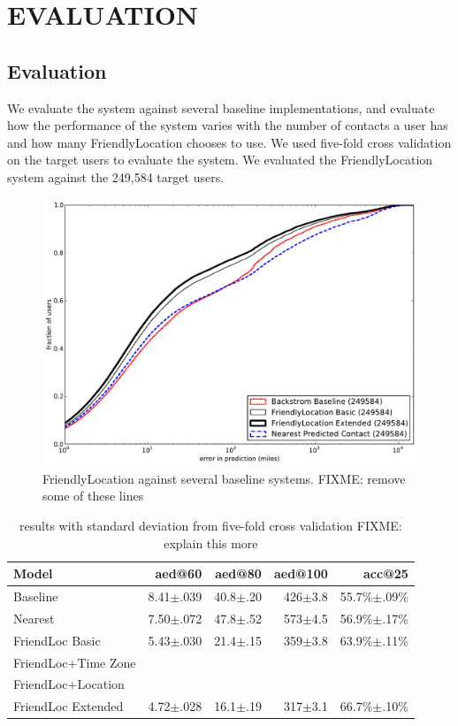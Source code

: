 \ifdefined\THESIS
    \chapter{\uppercase{Evaluation}}
\else
    \section{Evaluation}
\fi

We evaluate the system against several baseline implementations, and evaluate
how the performance of the system varies with the number of contacts a user has
and how many FriendlyLocation chooses to use.
We used five-fold cross validation on the target users to evaluate the system.
We evaluated the FriendlyLocation system against the 249,584 target users.

\begin{figure}[tb]
\centering
\includegraphics[width=\linewidth]{figures/fl_basic.pdf}
\caption{
    FriendlyLocation against several baseline systems.
    FIXME: remove some of these lines
}
\label{fig:baseline}
\end{figure}

\begin{table}[tb]
\centering
\begin{tabular}{l  r r r r}
    Model & aed@60 & aed@80 & aed@100 & acc@25 \\
    \hline
    Baseline & 8.41$\pm$.039 & 40.8$\pm$.20 & 426$\pm$3.8 & 55.7\%$\pm$.09\% \\
    Nearest & 7.50$\pm$.072 & 47.8$\pm$.52 & 573$\pm$4.5 & 56.9\%$\pm$.17\% \\
    FriendLoc Basic & 5.43$\pm$.030 & 21.4$\pm$.15 & 359$\pm$3.8 & 63.9\%$\pm$.11\% \\
    FriendLoc+Time Zone \\
    FriendLoc+Location \\
    FriendLoc Extended & 4.72$\pm$.028 & 16.1$\pm$.19 & 317$\pm$3.1 & 66.7\%$\pm$.10\% \\
\end{tabular}
\caption{
    results with standard deviation from five-fold cross validation
FIXME: explain this more
}
\label{tab:results}
\end{table}

